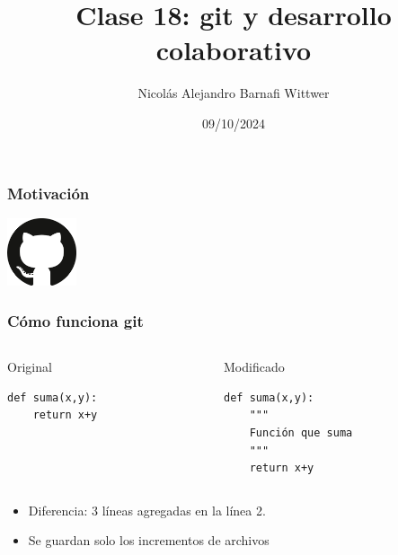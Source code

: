 \documentclass[14pt,aspectratio=169,xcolor=dvipsnames]{beamer}
\title[short title]{Clase 18: git y desarrollo colaborativo}
\subtitle{}
\author[NA Barnafi] {Nicolás Alejandro Barnafi Wittwer}
\institute[UC|CMM] 
{
    Pontificia Universidad Católica de Chile \\
    Centro de Modelamiento Matemático
}
\date{09/10/2024}
\begin{document}
\begin{frame}
    \maketitle
\end{frame}
\begin{frame}\frametitle{Motivación}
    {\huge
    \begin{center}
    \end{center}
    }
    \begin{flushright}
    \includegraphics[height=2cm]{../images/logos/git.png}
    \end{flushright}
\end{frame}
\begin{frame}[t,fragile]\frametitle{Cómo funciona git}
  \begin{columns}
    \begin{column}[t]{0.45\textwidth}
        Original
        \begin{verbatim}
def suma(x,y):
    return x+y
        \end{verbatim}
    \end{column}
    \begin{column}[t]{0.45\textwidth}
        Modificado
        \begin{verbatim}
def suma(x,y):
    """
    Función que suma
    """
    return x+y
        \end{verbatim}
    \end{column}
  \end{columns}

  \vspace{1cm}
  \begin{itemize}
  \item Diferencia: 3 líneas agregadas en la línea 2. 

  \item Se guardan solo los \alert{incrementos} de archivos
  \end{itemize}
\end{frame}
\end{document}
